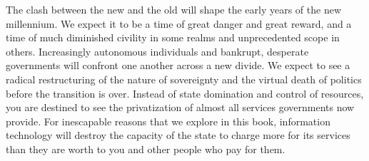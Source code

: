 \begin{paracol}{2}[]
\switchcolumn
The clash between the new and the old will shape the early years of the new millennium. We expect it to be a time of great danger and great reward, and a time of much diminished civility in some realms and unprecedented scope in others. Increasingly autonomous individuals and bankrupt, desperate governments will confront one another across a new divide. We expect to see a radical restructuring of the nature of sovereignty and the virtual death of politics before the transition is over. Instead of state domination and control of resources, you are destined to see the privatization of almost all services governments now provide. For inescapable reasons that we explore in this book, information technology will destroy the capacity of the state to charge more for its services than they are worth to you and other people who pay for them.

\end{paracol}

